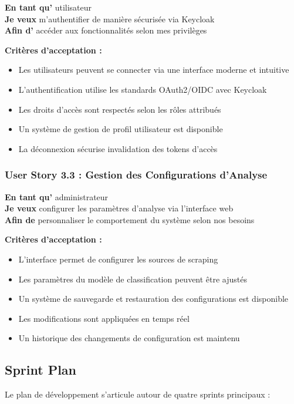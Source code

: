 \textbf{En tant qu'} utilisateur \\
\textbf{Je veux} m'authentifier de manière sécurisée via Keycloak \\
\textbf{Afin d'} accéder aux fonctionnalités selon mes privilèges

\textbf{Critères d'acceptation :}
\begin{itemize}
    \item Les utilisateurs peuvent se connecter via une interface moderne et intuitive
    \item L'authentification utilise les standards OAuth2/OIDC avec Keycloak
    \item Les droits d'accès sont respectés selon les rôles attribués
    \item Un système de gestion de profil utilisateur est disponible
    \item La déconnexion sécurise invalidation des tokens d'accès
\end{itemize}

\subsubsection{User Story 3.3 : Gestion des Configurations d'Analyse}

\textbf{En tant qu'} administrateur \\
\textbf{Je veux} configurer les paramètres d'analyse via l'interface web \\
\textbf{Afin de} personnaliser le comportement du système selon nos besoins

\textbf{Critères d'acceptation :}
\begin{itemize}
    \item L'interface permet de configurer les sources de scraping
    \item Les paramètres du modèle de classification peuvent être ajustés
    \item Un système de sauvegarde et restauration des configurations est disponible
    \item Les modifications sont appliquées en temps réel
    \item Un historique des changements de configuration est maintenu
\end{itemize}

\subsection{Sprint Plan}

Le plan de développement s'articule autour de quatre sprints principaux :

